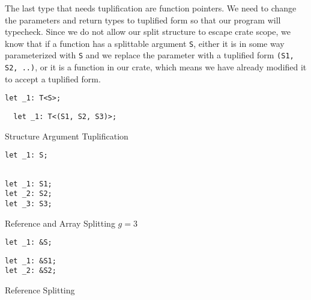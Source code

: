 \documentclass[prodmode,acmtecs]{acmsmall} %
\begin{document}
The last type that needs tuplification are function pointers. We 
need to change the parameters and return types to tuplified form
so that our program will typecheck. Since we do not allow our split structure
to escape crate scope, we know that if a function has a splittable
argument \texttt{S}, either it is in some way parameterized with
\texttt{S} and we replace the parameter with a tuplified form
\texttt{(S1, S2, ..)}, or it is a function in our crate, which
means we have already modified it to accept a tuplified form.

\begin{listing*}[p]
  \begin{minipage}[t]{0.5\linewidth}
\begin{verbatim}
let _1: T<S>;
\end{verbatim}
  \end{minipage}
  \begin{minipage}[t]{0.5\linewidth}
\begin{verbatim}
  let _1: T<(S1, S2, S3)>;
\end{verbatim}
  \end{minipage}
  \caption{Structure Argument Tuplification}
  \label{fig:localdeclbefore}
\end{listing*}

\begin{listing*}
  \begin{minipage}[t]{0.5\linewidth}
\begin{verbatim}
let _1: S;
\end{verbatim}
  \end{minipage}
  \begin{minipage}[t]{0.5\linewidth}
\begin{verbatim}

let _1: S1;
let _2: S2;
let _3: S3;

\end{verbatim}
  \end{minipage}
  
  \caption{Reference and Array Splitting $g = 3$}
  \label{fig:localdeclbefore}
\end{listing*}
\begin{listing*}
  \begin{minipage}[t]{0.5\linewidth}
\begin{verbatim}
let _1: &S;
\end{verbatim}
  \end{minipage}
  \begin{minipage}[t]{0.5\linewidth}
\begin{verbatim}
let _1: &S1;
let _2: &S2;
\end{verbatim}
  \end{minipage}
  \caption{Reference Splitting}
  \label{fig:refedecl}
\end{listing*}
\end{document}
